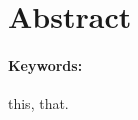 \documentclass[a4paper,oneside,10pt]{article}
\begin{document}
\setlength{\headheight}{50pt}



\thispagestyle{titlepage} 
\pagestyle{fancy}
\fancyhf{}
\renewcommand{\headrulewidth}{0.0pt}
\renewcommand{\footrulewidth}{0.0pt}
\fancyfoot[C]{\thepage}

\section*{Abstract}
\begin{singlespace}
\textit{\blindtext}
\end{singlespace}

\paragraph*{Keywords:} this, that.





%
%
%


%

\printbibliography
\end{document}
